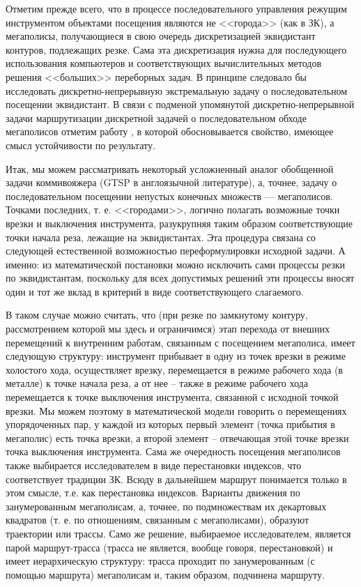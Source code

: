 \documentclass[11pt,twoside]{report}
\begin{document}
Отметим прежде всего, что в процессе последовательного управления режущим инструментом объектами посещения являются не <<города>> (как в ЗК), а мегаполисы, получающиеся в свою очередь дискретизацией эквидистант контуров, подлежащих резке. Сама эта дискретизация нужна для последующего использования компьютеров и соответствующих вычислительных методов решения <<больших>> переборных задач. В принципе следовало бы исследовать дискретно-непрерывную экстремальную задачу о последовательном посещении эквидистант. В связи с подменой упомянутой дискретно-непрерывной задачи маршрутизации дискретной задачей о последовательном обходе мегаполисов отметим работу \cite{intro01}, в которой обосновывается свойство, имеющее смысл устойчивости по результату.

Итак, мы можем рассматривать некоторый усложненный аналог обобщенной задачи коммивояжера (GTSP в англоязычной литературе), а, точнее, задачу о последовательном посещении непустых конечных множеств — мегаполисов. Точками последних, т. е. <<городами>>, логично полагать возможные точки врезки и выключения инструмента, разукрупняя таким образом соответствующие точки начала реза, лежащие на эквидистантах. Эта процедура связана со следующей естественной возможностью переформулировки исходной задачи. А именно: из математической постановки можно исключить сами процессы резки по эквидистантам, поскольку для всех допустимых решений эти процессы вносят один и тот же вклад в критерий в виде соответствующего слагаемого.

В таком случае можно считать, что (при резке по замкнутому контуру, рассмотрением которой мы здесь и ограничимся) этап перехода от внешних перемещений к внутренним работам, связанным с посещением мегаполиса, имеет следующую структуру: инструмент прибывает в одну из точек врезки в режиме холостого хода, осуществляет врезку, перемещается в режиме рабочего хода (в металле) к точке начала реза, а от нее – также в режиме рабочего хода перемещается к точке выключения инструмента, связанной с исходной точкой врезки. Мы можем поэтому в математической модели говорить о перемещениях упорядоченных пар, у каждой из которых первый элемент (точка прибытия в мегаполис) есть точка врезки, а второй элемент – отвечающая этой точке врезки точка выключения инструмента. Сама же очередность посещения мегаполисов также выбирается исследователем в виде перестановки индексов, что соответствует традиции ЗК. Всюду в дальнейшем маршрут понимается только в этом смысле, т.е. как перестановка индексов. Варианты движения по занумерованным мегаполисам, а, точнее, по подмножествам их декартовых квадратов (т. е. по отношениям, связанным с мегаполисами), образуют траектории или трассы. Само же решение, выбираемое исследователем, является парой маршрут-трасса (трасса не является, вообще говоря, перестановкой) и имеет иерархическую структуру: трасса проходит по занумерованным (с помощью маршрута) мегаполисам и, таким образом, подчинена маршруту.
\end{document}
